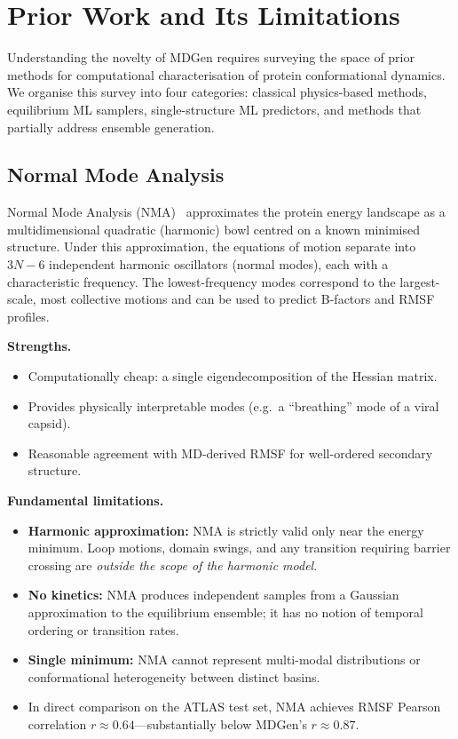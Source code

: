 \documentclass[11pt,a4paper]{article}
\begin{document}
\section{Prior Work and Its Limitations}
\label{sec:priorwork}

Understanding the novelty of MDGen requires surveying the space of prior methods for computational
characterisation of protein conformational dynamics.  We organise this survey into four categories:
classical physics-based methods, equilibrium ML samplers, single-structure ML predictors, and
methods that partially address ensemble generation.

\subsection{Normal Mode Analysis}

Normal Mode Analysis (NMA)~\cite{tirion1996,brooks1983} approximates the protein energy landscape
as a multidimensional quadratic (harmonic) bowl centred on a known minimised structure.  Under this
approximation, the equations of motion separate into $3N-6$ independent harmonic oscillators (normal
modes), each with a characteristic frequency.  The lowest-frequency modes correspond to the
largest-scale, most collective motions and can be used to predict B-factors and RMSF profiles.

\textbf{Strengths.}
\begin{itemize}[leftmargin=2em]
  \item Computationally cheap: a single eigendecomposition of the Hessian matrix.
  \item Provides physically interpretable modes (e.g.\ a ``breathing'' mode of a viral capsid).
  \item Reasonable agreement with MD-derived RMSF for well-ordered secondary structure.
\end{itemize}

\textbf{Fundamental limitations.}
\begin{itemize}[leftmargin=2em]
  \item \textbf{Harmonic approximation:} NMA is strictly valid only near the energy minimum.
    Loop motions, domain swings, and any transition requiring barrier crossing are
    \emph{outside the scope of the harmonic model}.
  \item \textbf{No kinetics:} NMA produces independent samples from a Gaussian approximation to
    the equilibrium ensemble; it has no notion of temporal ordering or transition rates.
  \item \textbf{Single minimum:} NMA cannot represent multi-modal distributions or conformational
    heterogeneity between distinct basins.
  \item In direct comparison on the ATLAS test set, NMA achieves RMSF Pearson correlation
    $r \approx 0.64$---substantially below MDGen's $r \approx 0.87$.
\end{itemize}
\end{document}
